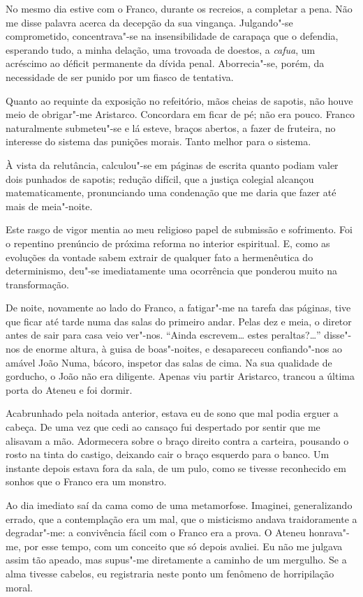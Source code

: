 No mesmo dia estive com o Franco, durante os recreios, a completar a pena.
Não me disse palavra acerca da decepção da sua vingança. Julgando"-se
comprometido, concentrava"-se na insensibilidade de carapaça que o
defendia, esperando tudo, a minha delação, uma trovoada de doestos, a
\textit{cafua}, um acréscimo ao déficit permanente da dívida penal.
Aborrecia"-se, porém, da necessidade de ser punido por um fiasco de tentativa. 

Quanto ao requinte da exposição no refeitório, mãos cheias
de sapotis, não houve meio de obrigar"-me Aristarco. Concordara em ficar
de pé; não era pouco. Franco naturalmente submeteu"-se e lá esteve,
braços abertos, a fazer de fruteira, no interesse do sistema das
punições morais. Tanto melhor para o sistema. 

À vista da relutância,
calculou"-se em páginas de escrita quanto podiam valer dois punhados
de sapotis; redução difícil, que a justiça colegial alcançou
matematicamente, pronunciando uma condenação que me daria que fazer até
mais de meia"-noite. 

Este rasgo de vigor mentia ao meu religioso papel
de submissão e sofrimento. Foi o repentino prenúncio de próxima reforma
no interior espiritual. E, como as evoluções da vontade sabem extrair
de qualquer fato a hermenêutica do determinismo, deu"-se imediatamente
uma ocorrência que ponderou muito na transformação. 

De noite, novamente
ao lado do Franco, a fatigar"-me na tarefa das páginas, tive que ficar
até tarde numa das salas do primeiro andar. Pelas dez e meia, o diretor
antes de sair para casa veio ver"-nos. ``Ainda escrevem\ldots{} estes
peraltas?\ldots{}'' disse"-nos de enorme altura, à guisa de boas"-noites, e
desapareceu confiando"-nos ao amável João Numa, bácoro, inspetor das
salas de cima. Na sua qualidade de gorducho, o João não era diligente.
Apenas viu partir Aristarco, trancou a última porta do 
Ateneu e foi dormir. 

Acabrunhado pela noitada anterior, estava eu de sono que mal
podia erguer a cabeça. De uma vez que cedi ao cansaço fui despertado
por sentir que me alisavam a mão. Adormecera sobre o braço direito
contra a carteira, pousando o rosto na tinta do castigo, deixando cair
o braço esquerdo para o banco. Um instante depois estava fora da sala,
de um pulo, como se tivesse reconhecido em sonhos que o Franco era um
monstro. 

Ao dia imediato saí da cama como de uma metamorfose. Imaginei,
generalizando errado, que a contemplação era um mal, que o misticismo
andava traidoramente a degradar"-me: a convivência fácil com o Franco 
era a prova. O Ateneu honrava"-me, por esse tempo,
com um conceito que só depois avaliei. Eu não me julgava assim tão
apeado, mas supus"-me diretamente a caminho de um mergulho. Se a alma
tivesse cabelos, eu registraria neste ponto um fenômeno de horripilação
moral. 

